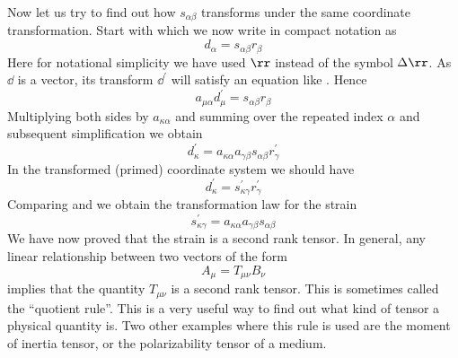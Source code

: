 \begin{subappendices}
Now let us try to find out how $s_{\alpha\beta}$ transforms
under the same coordinate transformation. Start with 
which we now write in compact notation as 
\begin{equation}
d_{\alpha} = s_{\alpha\beta}r_{\beta}
\end{equation}
Here for notational simplicity we have used $\rr$ instead of the
symbol $\Delta \rr$. 
As $\dd$ is a vector, its transform $\dd^{\prime}$ will satisfy an 
equation like . Hence
\begin{equation}
a_{\mu\alpha}d^{\prime}_{\mu} = s_{\alpha\beta}r_{\beta}
\end{equation} 
Multiplying both sides by $a_{\kappa\alpha}$ and summing over the
repeated index $\alpha$ and subsequent simplification we obtain
\begin{equation}
d^{\prime}_{\kappa} =
  a_{\kappa\alpha}a_{\gamma\beta}s_{\alpha\beta}r^{\prime}_{\gamma}
\label{eq:ss}
\end{equation}
In the transformed (primed) coordinate system we should have 
\begin{equation}
d^{\prime}_{\kappa} = s^{\prime}_{\kappa\gamma}r^{\prime}_{\gamma}
\label{eq:sprime}
\end{equation}
Comparing  and  we obtain the transformation
law for the strain
\begin{equation}
\boxed{s^{\prime}_{\kappa\gamma} = a_{\kappa\alpha}a_{\gamma\beta}s_{\alpha\beta}}
\end{equation}
We have now proved that the strain is a second rank tensor. In
general, any linear relationship between two vectors of the form
\begin{equation}
A_{\mu} = T_{\mu\nu}B_{\nu}
\label{eq:quotient}
\end{equation}
implies that the quantity $T_{\mu\nu}$ is a second rank tensor. 
This is sometimes called the ``quotient rule''. 
This is a very useful way to find out what kind of tensor a physical
quantity is. Two other examples where this rule is used are the moment of inertia tensor, or the polarizability
tensor of a medium. 


\end{subappendices}
